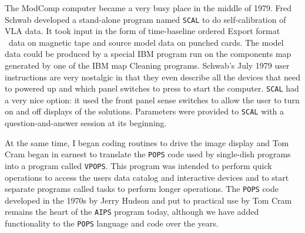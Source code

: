 The ModComp computer became a very busy place in the middle of 1979.
Fred Schwab developed a stand-alone program named {\tt SCAL} to do
self-calibration of VLA data.  It took input in the form of
time-baseline ordered Export format \uv\ data on magnetic tape and
source model data on punched cards.  The model data could be produced
by a special IBM program run on the components map generated by one of
the IBM map Cleaning programs.  Schwab's July 1979 user instructions
are very nostalgic in that they even describe all the devices that
need to powered up and which panel switches to press to start the
computer.  {\tt SCAL} had a very nice option: it used the front panel
sense switches to allow the user to turn on and off displays of the
solutions.  Parameters were provided to {\tt SCAL} with a
question-and-answer session at its beginning.

At the same time, I began coding routines to drive the image display
and Tom Cram began in earnest to translate the {\tt POPS} code used by
single-dish programs into a program called \hbox{{\tt VPOPS}}.  This
program was intended to perform quick operations to access the users
data catalog and interactive devices and to start separate programs
called tasks to perform longer operations.  The {\tt POPS} code
developed in the 1970s by Jerry Hudson and put to practical use by Tom
Cram remains the heart of the {\tt AIPS} program today, although we
have added functionality to the {\tt POPS} language and code over the
years.

